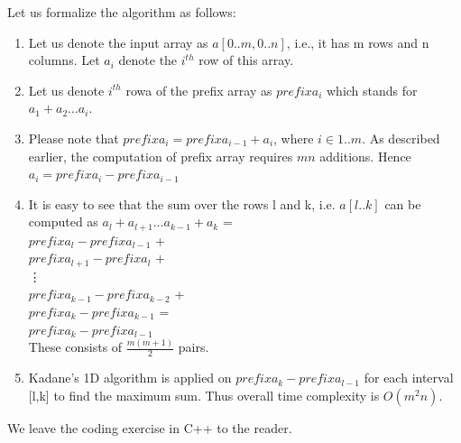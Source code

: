 Let us formalize the algorithm as follows:\\
\begin{enumerate}
    \item Let us denote the input array as $a[0..m, 0..n]$, i.e., it has m rows and n columns. Let $a_{i}$ denote the $i^{th}$ row of this array.
    \item Let us denote $i^{th}$ rowa of the prefix array as $prefixa_{i}$ which stands for $a_{1} + a_{2} \ldots a_{i}$.
    \item Please note that $prefixa_{i} = prefixa_{i - 1} +  a_{i}$, where $i \in {1..m}$. As described earlier, the computation of prefix array requires $mn$ additions. Hence \\
     $a_{i} = prefixa_{i} - prefixa_{i - 1}$
    \item It is easy to see that the sum over the rows l and k, i.e. $a[l..k]$ can be computed as $a_{l} + a_{l + 1} \ldots a_{k - 1} + a_{k}$  = \\
    $prefixa_{l} - prefixa_{l - 1}$ +\\
    $prefixa_{l + 1} - prefixa_{l}$ +\\
    \vdots\\
    $prefixa_{k - 1} - prefixa_{k - 2}$ +\\
    $prefixa_{k} - prefixa_{k - 1}$ = \\
    $prefixa_{k} -  prefixa_{l - 1}$\\
    These consists of $\frac{m(m + 1)}{2}$ pairs.
   \item Kadane\rq{}s 1D algorithm is applied on $prefixa_{k} -  prefixa_{l - 1}$ for each interval [l,k] to find the maximum sum. Thus overall time complexity is $O(m^{2}n)$. 
\end{enumerate}
We leave the coding exercise in C++ to the reader.


